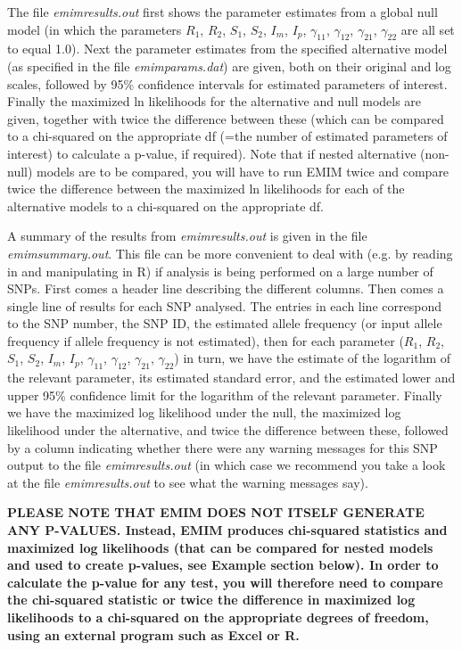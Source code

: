 \documentclass[a4paper,12pt]{article}
\begin{document}
The file {\it emimresults.out} first shows the parameter estimates from a global null model (in which the parameters $R_1$, $R_2$, $S_1$, $S_2$, $I_m$, $I_p$, $\gamma_{11}$, $\gamma_{12}$, $\gamma_{21}$, $\gamma_{22}$ are all set to equal 1.0). Next the parameter estimates from the specified alternative model (as specified in the file {\it emimparams.dat}) are given, both on their original and log scales, followed by 95\% confidence intervals for estimated parameters of interest. Finally the maximized ln likelihoods for the alternative and null models are given, together with twice the difference between these (which can be compared to a chi-squared on the appropriate df (=the number of estimated parameters of interest) to calculate a p-value, if required). Note that if nested alternative (non-null) models are to be compared, you will have to run EMIM twice and compare twice the difference between the maximized ln likelihoods for each of the alternative models to a chi-squared on the appropriate df. 

A summary of the results from {\it emimresults.out} is given in the file {\it emimsummary.out}. This file can be more convenient to deal with (e.g. by reading in and manipulating in R) if analysis is being performed on a large number of SNPs. First comes a header line describing the different columns. Then comes a single line of results for each SNP analysed. The entries in each line correspond to the SNP number, the SNP ID, the estimated allele frequency (or input allele frequency if allele frequency is not estimated), then for each parameter ($R_1$, $R_2$, $S_1$, $S_2$, $I_m$, $I_p$, $\gamma_{11}$, $\gamma_{12}$, $\gamma_{21}$, $\gamma_{22}$) in turn, we have the estimate of the logarithm of the relevant parameter, its estimated standard error, and the estimated lower and upper 95\% confidence limit for the logarithm of the relevant parameter. Finally we have the maximized log likelihood under the null, the maximized log likelihood under the alternative, and twice the difference between these, followed by a column indicating whether there were any warning messages for this SNP output to the file {\it emimresults.out} (in which case we recommend you take a look at the file {\it emimresults.out} to see what the warning messages say). 

{\bf PLEASE NOTE THAT EMIM DOES NOT ITSELF GENERATE ANY P-VALUES. Instead, EMIM produces chi-squared statistics and maximized log likelihoods (that can be compared for nested models and used to create p-values, see Example section below). In order to calculate the p-value for any test, you will therefore need to compare the chi-squared statistic or twice the difference in maximized log likelihoods to a chi-squared on the appropriate degrees of freedom, using an external program such as Excel or R.} 
\end{document}
